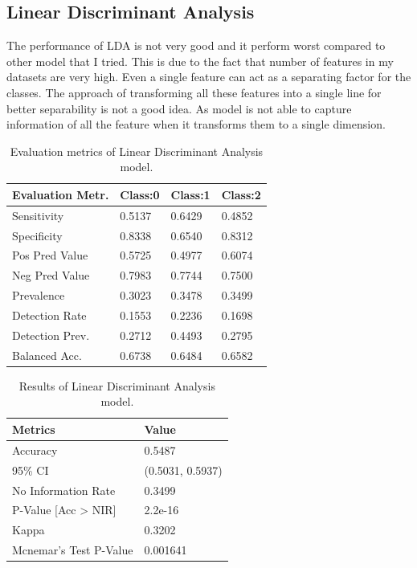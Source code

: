 \documentclass[11pt,a4paper]{article}
\begin{document}
\subsection{Linear Discriminant Analysis}
The performance of LDA is not very good and it perform worst compared to other model that I tried. This is due to the fact that number of features in my datasets are very high. Even a single feature can act as a separating factor for the classes. The approach of transforming all these features into a single line for better separability is not a good idea. As model is not able to capture information of all the feature when it transforms them to a single dimension.
\begin{table} [h]
	\centering
	\caption{Evaluation metrics of Linear Discriminant Analysis model.}
	\begin{tabular}{|l|l|l|l|} 
		\hline
		\textbf{Evaluation Metr.} & \textbf{Class:0} & \textbf{Class:1} & \textbf{Class:2}  \\ 
		\hline
		Sensitivity                 & 0.5137           & 0.6429           & 0.4852            \\ 
		\hline
		Specificity                 & 0.8338           & 0.6540           & 0.8312            \\ 
		\hline
		Pos Pred Value              & 0.5725           & 0.4977           & 0.6074            \\ 
		\hline
		Neg Pred Value              & 0.7983           & 0.7744           & 0.7500            \\ 
		\hline
		Prevalence                  & 0.3023           & 0.3478           & 0.3499            \\ 
		\hline
		Detection Rate              & 0.1553           & 0.2236           & 0.1698            \\ 
		\hline
		Detection Prev.      & 0.2712           & 0.4493           & 0.2795            \\ 
		\hline
		Balanced Acc.        & 0.6738           & 0.6484           & 0.6582            \\
		\hline
	\end{tabular}
\end{table}
\begin{table}[h]
	\centering
	\caption{Results of Linear Discriminant Analysis model.}
	\begin{tabular}{|l|l|} 
		\hline
		\textbf{Metrics}                 & \textbf{Value}    \\ 
		\hline
		Accuracy                         & 0.5487            \\ 
		\hline
		95\% CI                          & (0.5031, 0.5937)  \\ 
		\hline
		No Information Rate              & 0.3499            \\ 
		\hline
		P-Value [Acc \textgreater{} NIR] &  2.2e-16          \\ 
		\hline
		Kappa                            & 0.3202            \\ 
		\hline
		Mcnemar's Test P-Value           & 0.001641          \\
		\hline
	\end{tabular}
\end{table}
\end{document}
